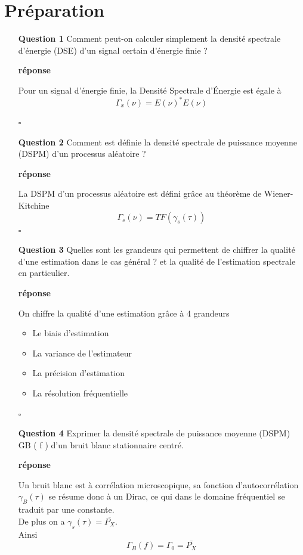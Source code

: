 \documentclass{article}
\newcommand{\debutrep}[1]{\color{blue}\begin{center} \hrulefill \textbf{ #1 } \hrulefill \end{center} }
\newcommand{\finrep}{\vspace*{5mm}\hfill $\square$\color{black}\vspace*{5mm}}
\begin{document}
\vspace*{5mm}

\section{Préparation}

\begin{itemize}
\item[{\bf Question 1}] Comment peut-on calculer simplement la densité spectrale d’énergie (DSE) d’un signal certain d’énergie finie ?

\debutrep{réponse}
Pour un signal d'énergie finie, la Densité Spectrale d'Énergie est égale à 
\[\Gamma_x(\nu) = E(\nu)^*E(\nu)\]

\finrep

\item[{\bf Question 2}] Comment est définie la densité spectrale de puissance moyenne (DSPM) d’un processus aléatoire ?

\debutrep{réponse}
La DSPM d'un processus aléatoire est défini grâce au théorème de Wiener-Kitchine
\[
\Gamma_s(\nu) = TF(\gamma_s(\tau))
\]
\finrep

\item[{\bf Question 3}] Quelles sont les grandeurs qui permettent de chiffrer la qualité d’une estimation dans le cas général ? et la qualité de l’estimation spectrale en particulier.

\debutrep{réponse}
On chiffre la qualité d'une estimation grâce à 4 grandeurs
\begin{itemize}
    \item Le biais d'estimation
    \item La variance de l'estimateur
    \item La précision d'estimation
    \item La résolution fréquentielle
\end{itemize}
\finrep

\item[{\bf Question 4}] Exprimer la densité spectrale de puissance moyenne (DSPM) GB ( f ) d’un bruit blanc stationnaire centré.

\debutrep{réponse}
Un bruit blanc est à corrélation microscopique, sa fonction d'autocorrélation $\gamma_B(\tau)$ se résume donc à un Dirac, ce qui dans le domaine fréquentiel se traduit par une constante. \\
De plus on a $\gamma_s(\tau) = \bar{P_X}$. \\
Ainsi
\[
\Gamma_B(f) = \Gamma_0 = \bar{P_X}
\]


\end{itemize}
\end{document}
